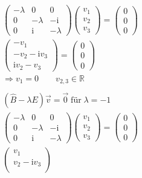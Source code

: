 \begin{align*}
    &\begin{pmatrix}
        -\lambda & 0 & 0\\
        0 & -\lambda & -\text{i}\\
        0 & \text{i} & -\lambda
    \end{pmatrix}
    \begin{pmatrix}
        v_1\\
        v_2\\
        v_3
    \end{pmatrix}
    =
    \begin{pmatrix}
        0\\
        0\\
        0
    \end{pmatrix}\\
    &\begin{pmatrix}
        -v_1\\
        -v_2-\text{i}v_3\\
        \text{i}v_2-v_3
    \end{pmatrix}
    =
    \begin{pmatrix}
        0\\
        0\\
        0
    \end{pmatrix}\\
    &\Rightarrow v_1=0 \qquad v_{2,3}\in \mathbb{R}\\
    \\
    &\left( \hat{B}-\lambda E \right) \vec{v} = \vec{0}\;\text{für}\;\lambda = -1\\
    &\begin{pmatrix}
        -\lambda & 0 & 0\\
        0 & -\lambda & -\text{i}\\
        0 & \text{i} & -\lambda
    \end{pmatrix}
    \begin{pmatrix}
        v_1\\
        v_2\\
        v_3
    \end{pmatrix}
    =
    \begin{pmatrix}
        0\\
        0\\
        0
    \end{pmatrix}\\
    &\begin{pmatrix}
        v_1\\
        v_2-\text{i}v_3\\

\end{pmatrix}
\end{align*}
